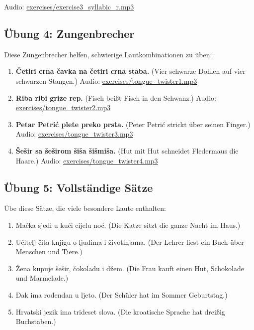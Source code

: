 Audio: \small\url{exercises/exercise3\_syllabic\_r.mp3}

\subsection{Übung 4: Zungenbrecher}

Diese Zungenbrecher helfen, schwierige Lautkombinationen zu üben:

\begin{enumerate}
    \item \textbf{Četiri crna čavka na četiri crna staba.}
    (Vier schwarze Dohlen auf vier schwarzen Stangen.)
    Audio: \small\url{exercises/tongue\_twister1.mp3}
    
    \item \textbf{Riba ribi grize rep.}
    (Fisch beißt Fisch in den Schwanz.)
    Audio: \small\url{exercises/tongue\_twister2.mp3}
    
    \item \textbf{Petar Petrić plete preko prsta.}
    (Peter Petrić strickt über seinen Finger.)
    Audio: \small\url{exercises/tongue\_twister3.mp3}
    
    \item \textbf{Šešir sa šeširom šiša šišmiša.}
    (Hut mit Hut schneidet Fledermaus die Haare.)
    Audio: \small\url{exercises/tongue\_twister4.mp3}
\end{enumerate}

\subsection{Übung 5: Vollständige Sätze}

Übe diese Sätze, die viele besondere Laute enthalten:

\begin{enumerate}
    \item Mačka sjedi u kući cijelu noć.
    (Die Katze sitzt die ganze Nacht im Haus.)
    
    \item Učitelj čita knjigu o ljudima i životinjama.
    (Der Lehrer liest ein Buch über Menschen und Tiere.)
    
    \item Žena kupuje šešir, čokoladu i džem.
    (Die Frau kauft einen Hut, Schokolade und Marmelade.)
    
    \item Đak ima rođendan u ljeto.
    (Der Schüler hat im Sommer Geburtstag.)
    
    \item Hrvatski jezik ima trideset slova.
    (Die kroatische Sprache hat dreißig Buchstaben.)
\end{enumerate}

